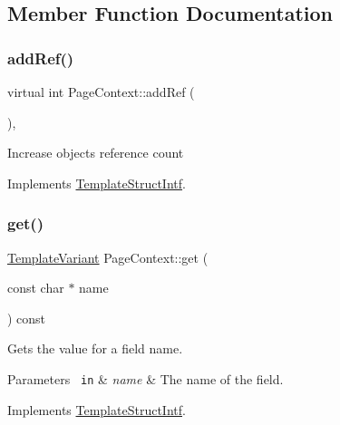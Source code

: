 \subsection{Member Function Documentation}
\mbox{\label{class_page_context_a70ce0b0a5fb9f2899053fddc2543f823}} 
\subsubsection{\texorpdfstring{addRef()}{addRef()}}
{\footnotesize\ttfamily virtual int Page\+Context\+::add\+Ref (\begin{DoxyParamCaption}{ }\end{DoxyParamCaption})\hspace{0.3cm}{\ttfamily [inline]}, {\ttfamily [virtual]}}

Increase object\textquotesingle{}s reference count 

Implements \mbox{\hyperlink{class_template_struct_intf_a05fe97ad47633beb326f69686faed581}{Template\+Struct\+Intf}}.

\mbox{\label{class_page_context_a777fceafe3c64f051a6cf2fdc3b69390}} 
\subsubsection{\texorpdfstring{get()}{get()}}
{\footnotesize\ttfamily \mbox{\hyperlink{class_template_variant}{Template\+Variant}} Page\+Context\+::get (\begin{DoxyParamCaption}\item[{const char $\ast$}]{name }\end{DoxyParamCaption}) const\hspace{0.3cm}{\ttfamily [virtual]}}

Gets the value for a field name. 
\begin{DoxyParams}[1]{Parameters}
\mbox{\texttt{ in}}  & {\em name} & The name of the field. \\
\hline
\end{DoxyParams}


Implements \mbox{\hyperlink{class_template_struct_intf_a3d610cb81b4adbb531ebed3aa3d09b51}{Template\+Struct\+Intf}}.

\mbox{\label{class_page_context_a7606be03a79df97def92c6bde9383f3c}} 
